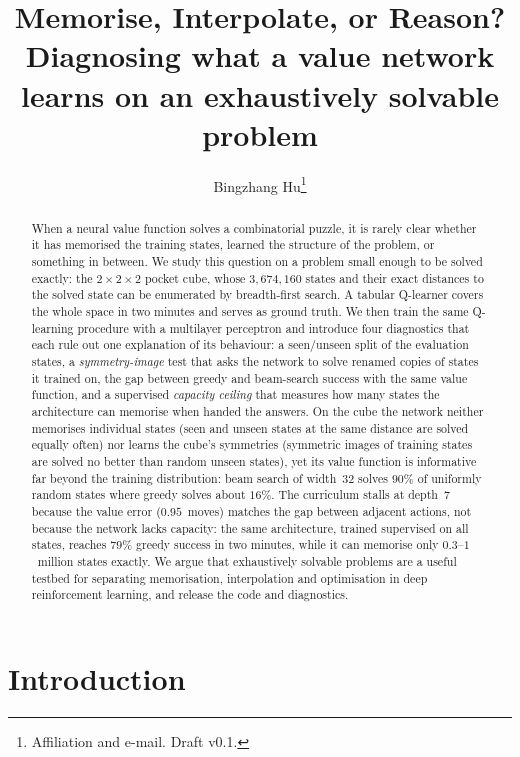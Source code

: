 \documentclass[11pt]{article}
\title{Memorise, Interpolate, or Reason?\\
\large Diagnosing what a value network learns on an exhaustively solvable problem}
\author{Bingzhang Hu\thanks{Affiliation and e-mail. Draft v0.1.}}
\date{}
\begin{document}
\maketitle

\begin{abstract}
When a neural value function solves a combinatorial puzzle, it is rarely clear whether it has
memorised the training states, learned the structure of the problem, or something in between.
We study this question on a problem small enough to be solved exactly: the $2\times2\times2$
pocket cube, whose $3{,}674{,}160$ states and their exact distances to the solved state can be
enumerated by breadth-first search. A tabular Q-learner covers the whole space in two minutes and
serves as ground truth. We then train the same Q-learning procedure with a multilayer perceptron
and introduce four diagnostics that each rule out one explanation of its behaviour: a
seen/unseen split of the evaluation states, a \emph{symmetry-image} test that asks the network to
solve renamed copies of states it trained on, the gap between greedy and beam-search success with
the same value function, and a supervised \emph{capacity ceiling} that measures how many states
the architecture can memorise when handed the answers. On the cube the network neither memorises
individual states (seen and unseen states at the same distance are solved equally often) nor
learns the cube's symmetries (symmetric images of training states are solved no better than
random unseen states), yet its value function is informative far beyond the training
distribution: beam search of width~32 solves $90\%$ of uniformly random states where greedy
solves about $16\%$. The curriculum stalls at depth~7 because the value error ($0.95$~moves)
matches the gap between adjacent actions, not because the network lacks capacity: the same
architecture, trained supervised on all states, reaches $79\%$ greedy success in two minutes,
while it can memorise only $0.3$--$1$~million states exactly. We argue that exhaustively solvable
problems are a useful testbed for separating memorisation, interpolation and optimisation in deep
reinforcement learning, and release the code and diagnostics.
\end{abstract}

\section{Introduction}
\end{document}
